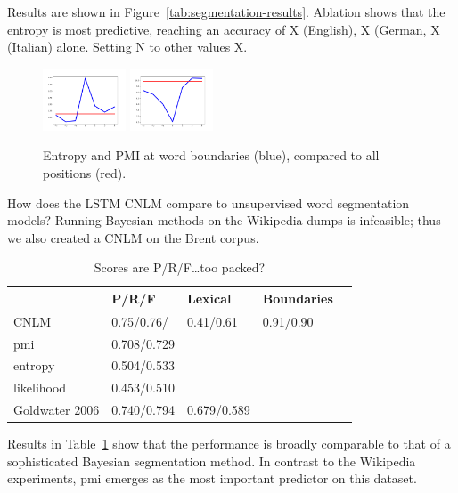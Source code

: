 Results are shown in Figure~\ref{tab:segmentation-results}.
Ablation shows that the entropy is most predictive, reaching an accuracy of X (English), X (German, X (Italian) alone.
Setting N to other values X.

\begin{figure}
\includegraphics[width=0.22\textwidth]{figures/segmentation-profile-flattened-entropies-german.png}
\includegraphics[width=0.22\textwidth]{figures/segmentation-profile-flattened-pmis-german.png}
	\caption{Entropy and PMI at word boundaries (blue), compared to all positions (red). }\label{fig:syntax-depth}
\end{figure}

How does the LSTM CNLM compare to unsupervised word segmentation models?
Running Bayesian methods on the Wikipedia dumps is infeasible; thus we also created a CNLM on the Brent corpus.

\begin{table}[t]
  \begin{center}
    \begin{tabular}{l|l|l|l|l}
      \multicolumn{1}{c}{}&P/R/F & Lexical & Boundaries\\      \hline
      CNLM & 0.75/0.76/ & 0.41/0.61 & 0.91/0.90 \\
     pmi & 0.708/0.729 \\
     entropy & 0.504/0.533 \\
     likelihood & 0.453/0.510 \\
      Goldwater 2006 & 0.740/0.794 & 0.679/0.589
    \end{tabular}
  \end{center}
  \caption{\label{tab:segmentation-results-brent} Scores are P/R/F\ldots too packed?}
\end{table}

Results in Table~\ref{tab:segmentation-results-brent} show that the performance is broadly comparable to that of a sophisticated Bayesian segmentation method.
In contrast to the Wikipedia experiments, pmi emerges as the most important predictor on this dataset.

